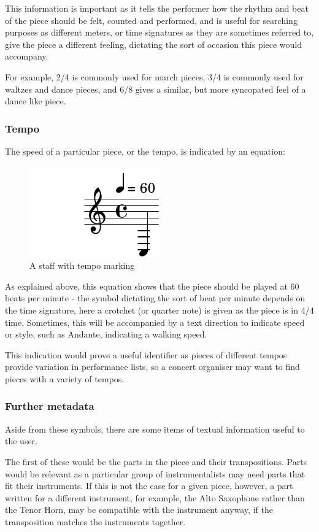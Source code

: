 This information is important as it tells the performer how the rhythm and beat of the piece should be felt, counted and performed, and is useful for searching purposes as different meters, or time signatures as they are sometimes referred to, give the piece a different feeling, dictating the sort of occasion this piece would accompany. 

For example, 2/4 is commonly used for march pieces, 3/4 is commonly used for waltzes and dance pieces, and 6/8 gives a similar, but more syncopated feel of a dance like piece.

\subsubsection{Tempo}
The speed of a particular piece, or the tempo, is indicated by an equation:

\begin{figure}[htbp]
    \centering
        \includegraphics{tempo-crop.pdf}
    \caption{A staff with tempo marking}
    \label{figure 1}
\end{figure}

As explained above, this equation shows that the piece should be played at 60 beats per minute - the symbol dictating the sort of beat per minute depends on the time signature, here a crotchet (or quarter note) is given as the piece is in 4/4 time. Sometimes, this will be accompanied by a text direction to indicate speed or style, such as Andante, indicating a walking speed.

This indication would prove a useful identifier as pieces of different tempos provide variation in performance lists, so a concert organiser may want to find pieces with a variety of tempos.

\subsubsection{Further metadata}
Aside from these symbols, there are some items of textual information useful to the user. 

The first of these would be the parts in the piece and their transpositions. Parts would be relevant as a particular group of instrumentalists may need parts that fit their instruments. If this is not the case for a given piece, however, a part written for a different instrument, for example, the Alto Saxophone rather than the Tenor Horn, may be compatible with the instrument anyway, if the transposition matches the instruments together.

